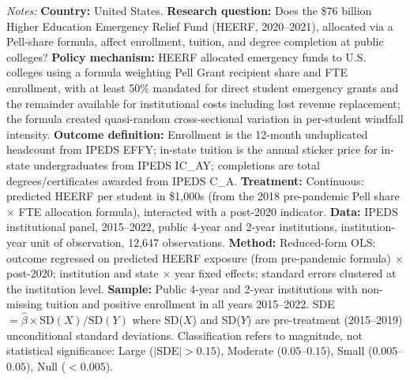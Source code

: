 \begin{table}[H]
\begin{minipage}{\textwidth}
{\textit{Notes:} \textbf{Country:} United States. \textbf{Research question:} Does the \$76 billion Higher Education Emergency Relief Fund (HEERF, 2020--2021), allocated via a Pell-share formula, affect enrollment, tuition, and degree completion at public colleges? \textbf{Policy mechanism:} HEERF allocated emergency funds to U.S. colleges using a formula weighting Pell Grant recipient share and FTE enrollment, with at least 50\% mandated for direct student emergency grants and the remainder available for institutional costs including lost revenue replacement; the formula created quasi-random cross-sectional variation in per-student windfall intensity. \textbf{Outcome definition:} Enrollment is the 12-month unduplicated headcount from IPEDS EFFY; in-state tuition is the annual sticker price for in-state undergraduates from IPEDS IC\_AY; completions are total degrees/certificates awarded from IPEDS C\_A. \textbf{Treatment:} Continuous: predicted HEERF per student in \$1,000s (from the 2018 pre-pandemic Pell share $\times$ FTE allocation formula), interacted with a post-2020 indicator. \textbf{Data:} IPEDS institutional panel, 2015--2022, public 4-year and 2-year institutions, institution-year unit of observation, 12,647 observations. \textbf{Method:} Reduced-form OLS: outcome regressed on predicted HEERF exposure (from pre-pandemic formula) $\times$ post-2020; institution and state $\times$ year fixed effects; standard errors clustered at the institution level. \textbf{Sample:} Public 4-year and 2-year institutions with non-missing tuition and positive enrollment in all years 2015--2022. SDE $= \hat{\beta} \times \text{SD}(X) / \text{SD}(Y)$ where SD($X$) and SD($Y$) are pre-treatment (2015--2019) unconditional standard deviations. Classification refers to magnitude, not statistical significance: Large ($|$SDE$| > 0.15$), Moderate ($0.05$--$0.15$), Small ($0.005$--$0.05$), Null ($< 0.005$).
}
\end{minipage}
\end{table}
